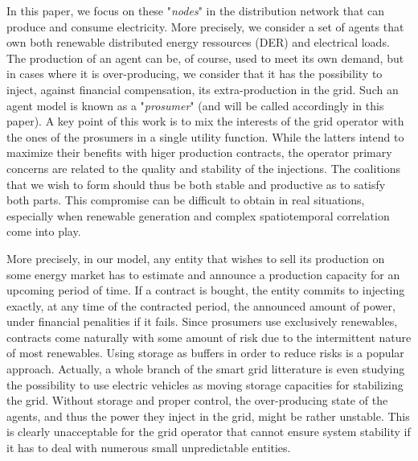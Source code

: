 \documentclass[conference]{IEEEtran}
\begin{document}

In this paper, we focus on these "\textit{nodes}" in the distribution network that can produce and consume electricity. More precisely, we consider a set of agents that own both renewable distributed energy ressources (DER) and electrical loads. The production of an agent can be, of course, used to meet its own demand, but in cases where it is over-producing, we consider that it has the possibility to inject, against financial compensation, its extra-production in the grid. Such an agent model is known as a "\textit{prosumer}" \cite{Rathnayaka2012} (and will be called accordingly in this paper). A key point of this work is to mix the interests of the grid operator with the ones of the prosumers in a single utility function. While the latters intend to maximize their benefits with higer production contracts, the operator primary concerns are related to the quality and stability of the injections. The coalitions that we wish to form should thus be both stable and productive as to satisfy both parts. This compromise can be difficult to obtain in real situations, especially when renewable generation and complex spatiotemporal correlation come into play.

More precisely, in our model, any entity that wishes to sell its production on some energy market has to estimate and announce a production capacity for an upcoming period of time. If a contract is bought, the entity commits to injecting exactly, at any time of the contracted period, the announced amount of power, under financial penalities if it fails. Since prosumers use exclusively renewables, contracts come naturally with some amount of risk due to the intermittent nature of most renewables. Using storage as buffers in order to reduce risks is a popular approach. Actually, a whole branch of the smart grid litterature is even studying the possibility to use electric vehicles as moving storage capacities for stabilizing the grid. Without storage and proper control, the over-producing state of the agents, and thus the power they inject in the grid, might be rather unstable. This is clearly unacceptable for the grid operator that cannot ensure system stability if it has to deal with numerous small unpredictable entities.
\end{document}
